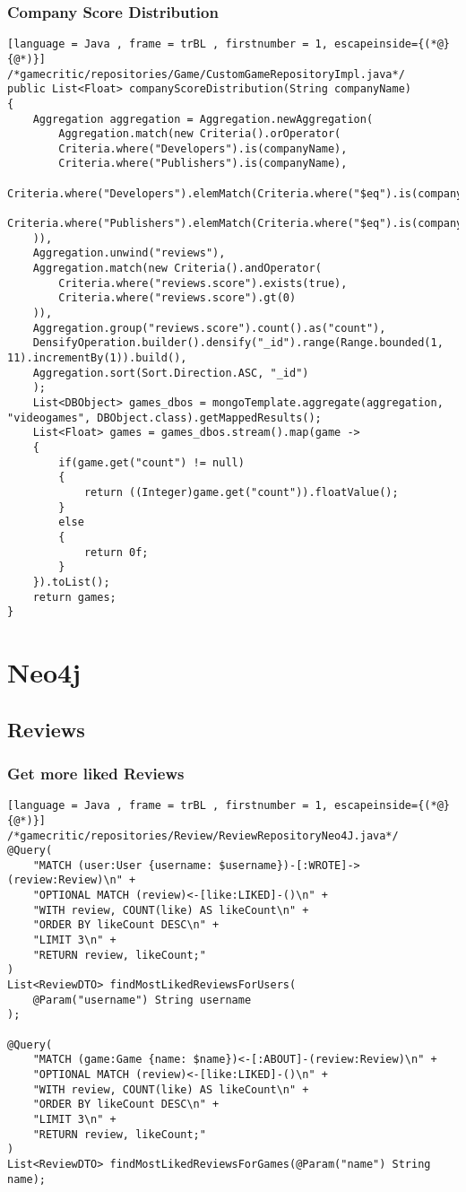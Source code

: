 \subsubsection{Company Score Distribution}
\begin{lstlisting}[language = Java , frame = trBL , firstnumber = 1, escapeinside={(*@}{@*)}]
/*gamecritic/repositories/Game/CustomGameRepositoryImpl.java*/
public List<Float> companyScoreDistribution(String companyName)
{
	Aggregation aggregation = Aggregation.newAggregation(
		Aggregation.match(new Criteria().orOperator(
		Criteria.where("Developers").is(companyName),
		Criteria.where("Publishers").is(companyName),
		Criteria.where("Developers").elemMatch(Criteria.where("$eq").is(companyName)),
		Criteria.where("Publishers").elemMatch(Criteria.where("$eq").is(companyName))
	)),
	Aggregation.unwind("reviews"),
	Aggregation.match(new Criteria().andOperator(
		Criteria.where("reviews.score").exists(true),
		Criteria.where("reviews.score").gt(0)
	)),
	Aggregation.group("reviews.score").count().as("count"),
	DensifyOperation.builder().densify("_id").range(Range.bounded(1, 11).incrementBy(1)).build(),
	Aggregation.sort(Sort.Direction.ASC, "_id")
	);
	List<DBObject> games_dbos = mongoTemplate.aggregate(aggregation, "videogames", DBObject.class).getMappedResults();
	List<Float> games = games_dbos.stream().map(game -> 
	{
		if(game.get("count") != null)
		{
			return ((Integer)game.get("count")).floatValue();
		}
		else
		{
			return 0f;
		}
	}).toList();
	return games;
}
\end{lstlisting}
\section{Neo4j}
\subsection{Reviews}
\subsubsection{Get more liked Reviews}
\begin{lstlisting}[language = Java , frame = trBL , firstnumber = 1, escapeinside={(*@}{@*)}]
/*gamecritic/repositories/Review/ReviewRepositoryNeo4J.java*/
@Query(
	"MATCH (user:User {username: $username})-[:WROTE]->(review:Review)\n" +
	"OPTIONAL MATCH (review)<-[like:LIKED]-()\n" +
	"WITH review, COUNT(like) AS likeCount\n" +
	"ORDER BY likeCount DESC\n" +
	"LIMIT 3\n" +
	"RETURN review, likeCount;"
)
List<ReviewDTO> findMostLikedReviewsForUsers(
	@Param("username") String username
);

@Query(
	"MATCH (game:Game {name: $name})<-[:ABOUT]-(review:Review)\n" +
	"OPTIONAL MATCH (review)<-[like:LIKED]-()\n" +
	"WITH review, COUNT(like) AS likeCount\n" +
	"ORDER BY likeCount DESC\n" +
	"LIMIT 3\n" +
	"RETURN review, likeCount;"
)
List<ReviewDTO> findMostLikedReviewsForGames(@Param("name") String name);
	
\end{lstlisting}
